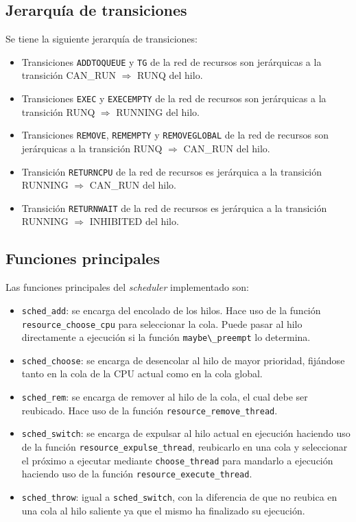 \documentclass[a4paper]{book}
\begin{document}
\subsection{Jerarqu\'ia de transiciones}

Se tiene la siguiente jerarqu\'ia de transiciones:
\begin{itemize}
\item Transiciones \verb|ADDTOQUEUE| y \verb|TG| de la red de recursos son jer\'arquicas a la transici\'on CAN\_RUN $\Rightarrow$ RUNQ del hilo.
\item Transiciones \verb|EXEC| y \verb|EXECEMPTY| de la red de recursos son jer\'arquicas a la transici\'on RUNQ $\Rightarrow$ RUNNING del hilo.
\item Transiciones \verb|REMOVE|, \verb|REMEMPTY| y \verb|REMOVEGLOBAL| de la red de recursos son jer\'arquicas a la transici\'on RUNQ $\Rightarrow$ CAN\_RUN del hilo.
\item Transici\'on \verb|RETURNCPU| de la red de recursos es jer\'arquica a la transici\'on RUNNING $\Rightarrow$ CAN\_RUN del hilo.
\item Transici\'on \verb|RETURNWAIT| de la red de recursos es jer\'arquica a la transici\'on RUNNING $\Rightarrow$ INHIBITED del hilo.
\end{itemize}

\subsection{Funciones principales}

Las funciones principales del \emph{scheduler} implementado son:
\begin{itemize}
\item \verb|sched_add|: se encarga del encolado de los hilos. Hace uso de la funci\'on \verb|resource_choose_cpu| para seleccionar la cola. Puede pasar al hilo directamente a ejecuci\'on si la funci\'on \verb|maybe\_preempt| lo determina.
\item \verb|sched_choose|: se encarga de desencolar al hilo de mayor prioridad, fij\'andose tanto en la cola de la CPU actual como en la cola global.
\item \verb|sched_rem|: se encarga de remover al hilo de la cola, el cual debe ser reubicado. Hace uso de la funci\'on \verb|resource_remove_thread|.
\item \verb|sched_switch|: se encarga de expulsar al hilo actual en ejecuci\'on haciendo uso de la funci\'on \verb|resource_expulse_thread|, reubicarlo en una cola y seleccionar el pr\'oximo a ejecutar mediante \verb|choose_thread| para mandarlo a ejecuci\'on haciendo uso de la funci\'on \verb|resource_execute_thread|.
\item \verb|sched_throw|: igual a \verb|sched_switch|, con la diferencia de que no reubica en una cola al hilo saliente ya que el mismo ha finalizado su ejecuci\'on.
\end{itemize}
\end{document}
